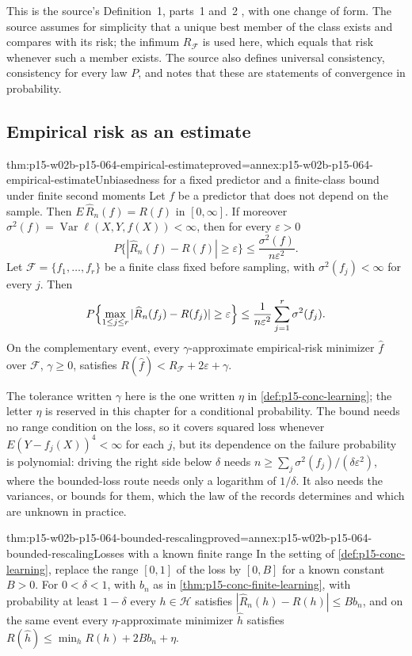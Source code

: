 This is the source's Definition~1, parts~1 and~2
\cite[Section~2.3, p.~7]{LuxburgScholkopf2008Author}, with one change of
form. The source assumes for simplicity that a unique best member of the
class exists and compares with its risk; the infimum \(R_{\mathcal F}\) is
used here, which equals that risk whenever such a member exists. The source
also defines universal consistency, consistency for every law \(P\), and
notes that these are statements of convergence in probability.

\subsection{Empirical risk as an estimate}

\begin{hbtheorem}{thm:p15-w02b-p15-064-empirical-estimate}{proved=annex:p15-w02b-p15-064-empirical-estimate}{Unbiasedness for a fixed predictor and a finite-class bound under finite second moments}
Let \(f\) be a predictor that does not depend on the sample. Then
\(E\,\widehat R_n(f)=R(f)\) in \([0,\infty]\). If moreover
\(\sigma^2(f)=\operatorname{Var}\ell(X,Y,f(X))<\infty\), then for every
\(\varepsilon>0\)
\[
 P\{|\widehat R_n(f)-R(f)|\geq\varepsilon\}\leq\frac{\sigma^2(f)}{n\varepsilon^2}.
\]
Let \(\mathcal F=\{f_1,\ldots,f_r\}\) be a finite class fixed before sampling,
with \(\sigma^2(f_j)<\infty\) for every \(j\). Then
\[
 P\Bigl\{\max_{1\leq j\leq r}|\widehat R_n(f_j)-R(f_j)|\geq\varepsilon\Bigr\}
 \leq\frac{1}{n\varepsilon^2}\sum_{j=1}^r\sigma^2(f_j).
\]
On the complementary event, every \(\gamma\)-approximate empirical-risk
minimizer \(\widehat f\) over \(\mathcal F\), \(\gamma\geq0\), satisfies
\(R(\widehat f)<R_{\mathcal F}+2\varepsilon+\gamma\).
\end{hbtheorem}

The tolerance written \(\gamma\) here is the one written \(\eta\) in
\cref{def:p15-conc-learning}; the letter \(\eta\) is reserved in this chapter
for a conditional probability. The bound needs no range condition on the
loss, so it covers squared loss whenever \(E(Y-f_j(X))^4<\infty\) for each
\(j\), but its
dependence on the failure probability is polynomial: driving the right side
below \(\delta\) needs \(n\geq\sum_j\sigma^2(f_j)/(\delta\varepsilon^2)\),
where the bounded-loss route needs only a logarithm of \(1/\delta\). It also
needs the variances, or bounds for them, which the law of the records
determines and which are unknown in practice.

\begin{hbcorollary}{thm:p15-w02b-p15-064-bounded-rescaling}{proved=annex:p15-w02b-p15-064-bounded-rescaling}{Losses with a known finite range}
In the setting of \cref{def:p15-conc-learning}, replace the range \([0,1]\)
of the loss by \([0,B]\) for a known constant \(B>0\). For \(0<\delta<1\),
with \(b_n\) as in \cref{thm:p15-conc-finite-learning}, with probability at
least \(1-\delta\) every \(h\in\mathcal H\) satisfies
\(|\widehat R_n(h)-R(h)|\leq Bb_n\), and on the same event every
\(\eta\)-approximate minimizer \(\widehat h\) satisfies
\(R(\widehat h)\leq\min_hR(h)+2Bb_n+\eta\).
\end{hbcorollary}

